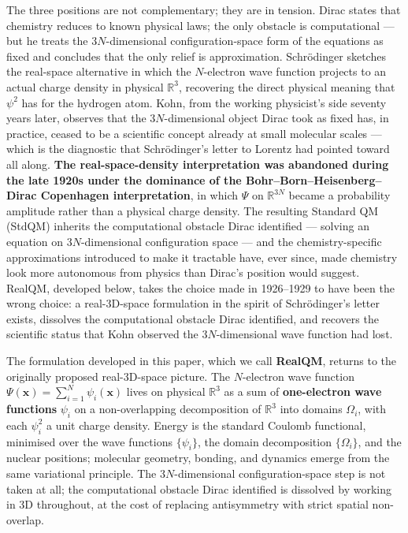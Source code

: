 \documentclass[11pt]{article}
\begin{document}
The three positions are not complementary; they are in tension. Dirac states that chemistry reduces to known physical laws; the only obstacle is computational --- but he treats the $3N$-dimensional configuration-space form of the equations as fixed and concludes that the only relief is approximation. Schr\"odinger sketches the real-space alternative in which the $N$-electron wave function projects to an actual charge density in physical $\mathbb{R}^3$, recovering the direct physical meaning that $\psi^2$ has for the hydrogen atom. Kohn, from the working physicist's side seventy years later, observes that the $3N$-dimensional object Dirac took as fixed has, in practice, ceased to be a scientific concept already at small molecular scales --- which is the diagnostic that Schr\"odinger's letter to Lorentz had pointed toward all along. \textbf{The real-space-density interpretation was abandoned during the late 1920s under the dominance of the Bohr--Born--Heisenberg--Dirac Copenhagen interpretation}, in which $\Psi$ on $\mathbb{R}^{3N}$ became a probability amplitude rather than a physical charge density. The resulting Standard QM (StdQM) inherits the computational obstacle Dirac identified --- solving an equation on $3N$-dimensional configuration space --- and the chemistry-specific approximations introduced to make it tractable have, ever since, made chemistry look more autonomous from physics than Dirac's position would suggest. RealQM, developed below, takes the choice made in 1926--1929 to have been the wrong choice: a real-3D-space formulation in the spirit of Schr\"odinger's letter exists, dissolves the computational obstacle Dirac identified, and recovers the scientific status that Kohn observed the $3N$-dimensional wave function had lost.

The formulation developed in this paper, which we call \textbf{RealQM}, returns to the originally proposed real-3D-space picture. The $N$-electron wave function $\Psi(\mathbf{x}) = \sum_{i=1}^N \psi_i(\mathbf{x})$ lives on physical $\mathbb{R}^3$ as a sum of \textbf{one-electron wave functions} $\psi_i$ on a non-overlapping decomposition of $\mathbb{R}^3$ into domains $\Omega_i$, with each $\psi_i^2$ a unit charge density. Energy is the standard Coulomb functional, minimised over the wave functions $\{\psi_i\}$, the domain decomposition $\{\Omega_i\}$, and the nuclear positions; molecular geometry, bonding, and dynamics emerge from the same variational principle. The $3N$-dimensional configuration-space step is not taken at all; the computational obstacle Dirac identified is dissolved by working in 3D throughout, at the cost of replacing antisymmetry with strict spatial non-overlap.
\end{document}
